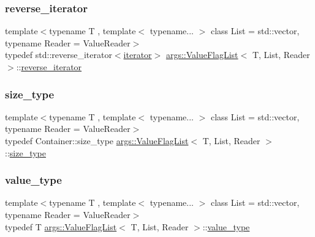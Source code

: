\subsubsection{\texorpdfstring{reverse\+\_\+iterator}{reverse\_iterator}}
{\footnotesize\ttfamily template$<$typename T , template$<$ typename... $>$ class List = std\+::vector, typename Reader  = Value\+Reader$>$ \\
typedef std\+::reverse\+\_\+iterator$<$\hyperlink{classargs_1_1_value_flag_list_a4374b7a70c21c42d72912ec5ce323515}{iterator}$>$ \hyperlink{classargs_1_1_value_flag_list}{args\+::\+Value\+Flag\+List}$<$ T, List, Reader $>$\+::\hyperlink{classargs_1_1_value_flag_list_a8d7e5e66818cba8579caaa0d2d59324a}{reverse\+\_\+iterator}}

\mbox{\label{classargs_1_1_value_flag_list_a27eb94c0f87dde63db987fbef5ff9a85}} 
\subsubsection{\texorpdfstring{size\+\_\+type}{size\_type}}
{\footnotesize\ttfamily template$<$typename T , template$<$ typename... $>$ class List = std\+::vector, typename Reader  = Value\+Reader$>$ \\
typedef Container\+::size\+\_\+type \hyperlink{classargs_1_1_value_flag_list}{args\+::\+Value\+Flag\+List}$<$ T, List, Reader $>$\+::\hyperlink{classargs_1_1_value_flag_list_a27eb94c0f87dde63db987fbef5ff9a85}{size\+\_\+type}}

\mbox{\label{classargs_1_1_value_flag_list_a74b1eb6bfcdb2cc60ecc142a6d3448c8}} 
\subsubsection{\texorpdfstring{value\+\_\+type}{value\_type}}
{\footnotesize\ttfamily template$<$typename T , template$<$ typename... $>$ class List = std\+::vector, typename Reader  = Value\+Reader$>$ \\
typedef T \hyperlink{classargs_1_1_value_flag_list}{args\+::\+Value\+Flag\+List}$<$ T, List, Reader $>$\+::\hyperlink{classargs_1_1_value_flag_list_a74b1eb6bfcdb2cc60ecc142a6d3448c8}{value\+\_\+type}}




